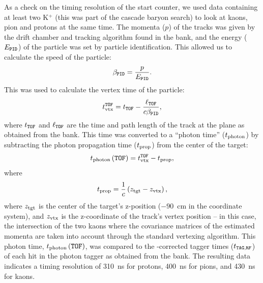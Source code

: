 As a check on the timing resolution of the start counter, we used data containing at least two K$^+$ (this was part of the cascade baryon search) to look at kaons, pion and protons at the same time. The momenta ($p$) of the tracks was given by the drift chamber and tracking algorithm found in the  bank, and the energy ($E_{\mathtt{PID}}$) of the particle was set by particle identification. This allowed us to calculate the speed of the particle:
\begin{equation}
    \beta_{\mathtt{PID}} = \frac{p}{E_{\mathtt{PID}}}.
    \label{eqn:betapid}
\end{equation}
This was used to calculate the vertex time of the particle:
\begin{equation}
    t_{\mathrm{vtx}}^{\mathtt{TOF}} = t_{\mathtt{TOF}} - \frac{\ell_{\mathtt{TOF}}}{c\beta_{\mathtt{PID}}},
    \label{eqn:tvtofpid}
\end{equation}
where $t_{\mathtt{TOF}}$ and $\ell_{\mathtt{TOF}}$ are the time and path length of the track at the  plane as obtained from the  bank. This time was converted to a ``photon time'' ($t_\mathrm{photon}$) by subtracting the photon propagation time ($t_{\mathrm{prop}}$) from the center of the target:
\begin{equation}
    t_\mathrm{photon}\left(\mathtt{TOF}\right) = t_{\mathrm{vtx}}^{\mathtt{TOF}} - t_{\mathrm{prop}},
    \label{eqn:tphotofpid}
\end{equation}
where
\begin{equation}
    t_{\mathrm{prop}} = \frac{1}{c} \left( z_\mathrm{tgt} - z_\mathrm{vtx} \right),
\end{equation}
where $z_\mathrm{tgt}$ is the center of the target's z-position ($-90$~cm in the  coordinate system), and $z_\mathrm{vtx}$ is the z-coordinate of the track's vertex position -- in this case, the intersection of the two kaons where the covariance matrices of the estimated momenta are taken into account through the standard  vertexing algorithm. This photon time, $t_\mathrm{photon}\left(\mathtt{TOF}\right)$, was compared to the -corrected tagger times ($t_{\mathtt{TAG},\mathtt{RF}}$) of each hit in the photon tagger as obtained from the  bank. The resulting data indicates a timing resolution of 310~ns for protons, 400~ns for pions, and 430~ns for kaons.

